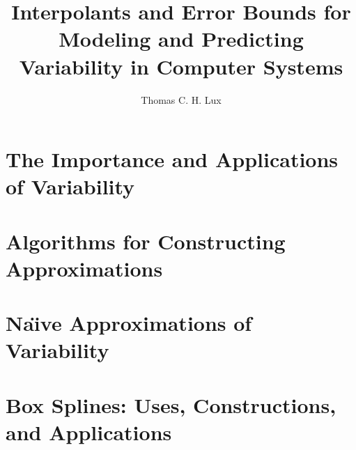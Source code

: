 \documentclass[doublespace,nopageskip]{VTthesis} %
\title{Interpolants and Error Bounds for Modeling and Predicting Variability in Computer Systems}
\author{Thomas C. H. Lux}
\begin{document}
\frontmatter
\maketitle
\tableofcontents

\listoffigures
\listoftables


\mainmatter


\chapter{The Importance and Applications of Variability} \label{ch:apps}


\chapter{Algorithms for Constructing Approximations} \label{ch:algs}


\chapter{Na\"{\i}ve Approximations of Variability} \label{ch:naive}


\chapter{Box Splines: Uses, Constructions, and Applications} \label{ch:boxes}

\end{document}

